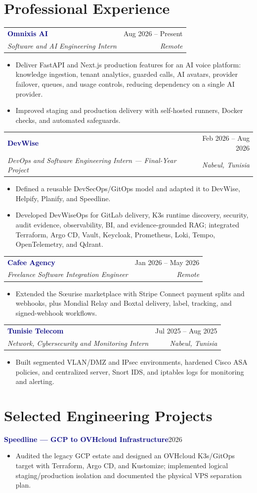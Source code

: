 \documentclass[9pt,a4paper]{extarticle}
\makeatletter
\newcommand{\entry}[4]{%
  \begin{tabularx}{\linewidth}{@{}Xr@{}}
    \textbf{\textcolor{navy}{#1}} & \textcolor{muted}{#3}\\[-2pt]
    \textit{#2} & \small\textit{\textcolor{muted}{#4}}\\
  \end{tabularx}\vspace{-4pt}}
\newcommand{\project}[2]{\textbf{\textcolor{navy}{#1}}\hfill\textcolor{muted}{#2}}
\makeatother
\begin{document}
\section*{Professional Experience}
\entry{Omnixis AI}{Software and AI Engineering Intern}{Aug 2026 -- Present}{Remote}
\begin{itemize}
  \item Deliver FastAPI and Next.js production features for an AI voice platform: knowledge ingestion, tenant analytics, guarded calls, AI avatars, provider failover, queues, and usage controls, reducing dependency on a single AI provider.
  \item Improved staging and production delivery with self-hosted runners, Docker checks, and automated safeguards.
\end{itemize}

\entry{DevWise}{DevOps and Software Engineering Intern --- Final-Year Project}{Feb 2026 -- Aug 2026}{Nabeul, Tunisia}
\begin{itemize}
  \item Defined a reusable DevSecOps/GitOps model and adapted it to DevWise, Helpify, Planify, and Speedline.
  \item Developed DevWiseOps for GitLab delivery, K3s runtime discovery, security, audit evidence, observability, BI, and evidence-grounded RAG; integrated Terraform, Argo CD, Vault, Keycloak, Prometheus, Loki, Tempo, OpenTelemetry, and Qdrant.
\end{itemize}

\entry{Cafee Agency}{Freelance Software Integration Engineer}{Jan 2026 -- May 2026}{Remote}
\begin{itemize}
  \item Extended the Sœurise marketplace with Stripe Connect payment splits and webhooks, plus Mondial Relay and Boxtal delivery, label, tracking, and signed-webhook workflows.
\end{itemize}

\entry{Tunisie Telecom}{Network, Cybersecurity and Monitoring Intern}{Jul 2025 -- Aug 2025}{Nabeul, Tunisia}
\begin{itemize}
  \item Built segmented VLAN/DMZ and IPsec environments, hardened Cisco ASA policies, and centralized server, Snort IDS, and iptables logs for monitoring and alerting.
\end{itemize}

\section*{Selected Engineering Projects}
\project{Speedline --- GCP to OVHcloud Infrastructure}{2026}
\begin{itemize}
  \item Audited the legacy GCP estate and designed an OVHcloud K3s/GitOps target with Terraform, Argo CD, and Kustomize; implemented logical staging/production isolation and documented the physical VPS separation plan.
\end{itemize}
\end{document}
